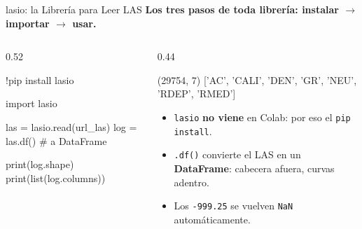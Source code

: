 \documentclass[aspectratio=169, 11pt]{beamer}
\begin{document}
\begin{frame}[fragile,shrink=15]{lasio: la Librería para Leer LAS}
  \vspace{-4pt}
  {\small\color{arcaDark}\bfseries
    Los tres pasos de toda librería: instalar \(\to\) importar \(\to\) usar.}

  \vspace{4pt}
  \begin{columns}[T]
    \begin{column}{0.52\textwidth}
      \begin{pyblock}
!pip install lasio

import lasio

las = lasio.read(url_las)
log = las.df()   # a DataFrame

print(log.shape)
print(list(log.columns))
      \end{pyblock}
    \end{column}

    \begin{column}{0.44\textwidth}
      \begin{outputblock}
(29754, 7)
['AC', 'CALI', 'DEN', 'GR',
 'NEU', 'RDEP', 'RMED']
      \end{outputblock}

      \vspace{4pt}
      {\scriptsize\color{textMuted}
      \begin{itemize}\setlength{\itemsep}{4pt}
        \item[{\color{arcaRed}\scriptsize\faArrowRight}]
          \texttt{lasio} \textbf{no viene} en Colab:
          por eso el \texttt{pip install}.
        \item[{\color{arcaRed}\scriptsize\faArrowRight}]
          \texttt{.df()} convierte el LAS en un
          \textbf{DataFrame}: cabecera afuera,
          curvas adentro.
        \item[{\color{codeGreen}\scriptsize\faCheck}]
          Los \texttt{-999.25} se vuelven
          \texttt{NaN} automáticamente.
      \end{itemize}
      }
    \end{column}
  \end{columns}
\end{frame}
\end{document}
